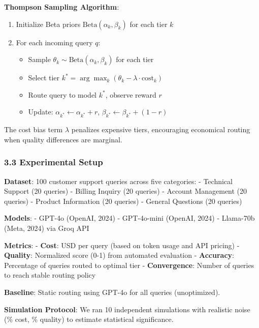 \documentclass[
  11pt,
]{article}
\providecommand{\tightlist}{%
  \setlength{\itemsep}{0pt}\setlength{\parskip}{0pt}}
\begin{document}
\textbf{Thompson Sampling Algorithm}:

\begin{enumerate}
\def\labelenumi{\arabic{enumi}.}
\tightlist
\item
  Initialize Beta priors \(\text{Beta}(\alpha_k, \beta_k)\) for each
  tier \(k\)
\item
  For each incoming query \(q\):

  \begin{itemize}
  \tightlist
  \item
    Sample \(\theta_k \sim \text{Beta}(\alpha_k, \beta_k)\) for each
    tier
  \item
    Select tier
    \(k^* = \arg\max_k (\theta_k - \lambda \cdot \text{cost}_k)\)
  \item
    Route query to model \(k^*\), observe reward \(r\)
  \item
    Update: \(\alpha_{k^*} \leftarrow \alpha_{k^*} + r\),
    \(\beta_{k^*} \leftarrow \beta_{k^*} + (1-r)\)
  \end{itemize}
\end{enumerate}

The cost bias term \(\lambda\) penalizes expensive tiers, encouraging
economical routing when quality differences are marginal.

\hypertarget{experimental-setup}{%
\subsubsection{3.3 Experimental Setup}\label{experimental-setup}}

\textbf{Dataset}: 100 customer support queries across five categories: -
Technical Support (20 queries) - Billing Inquiry (20 queries) - Account
Management (20 queries) - Product Information (20 queries) - General
Questions (20 queries)

\textbf{Models}: - GPT-4o (OpenAI, 2024) - GPT-4o-mini (OpenAI, 2024) -
Llama-70b (Meta, 2024) via Groq API

\textbf{Metrics}: - \textbf{Cost}: USD per query (based on token usage
and API pricing) - \textbf{Quality}: Normalized score (0-1) from
automated evaluation - \textbf{Accuracy}: Percentage of queries routed
to optimal tier - \textbf{Convergence}: Number of queries to reach
stable routing policy

\textbf{Baseline}: Static routing using GPT-4o for all queries
(unoptimized).

\textbf{Simulation Protocol}: We ran 10 independent simulations with
realistic noise (\% cost, \% quality) to estimate statistical
significance.
\end{document}
